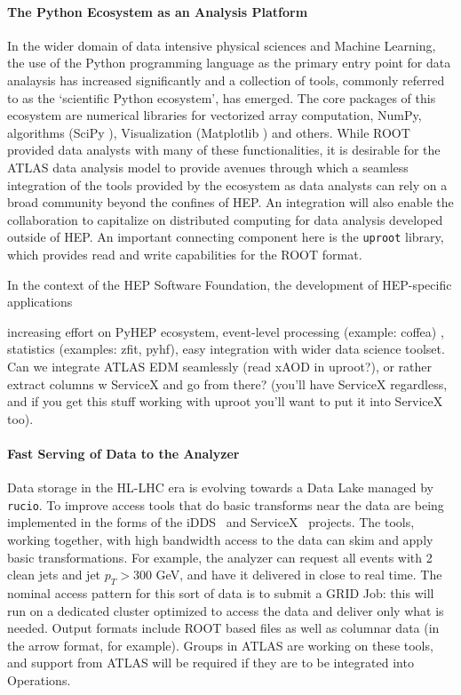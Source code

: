 \paragraph{The Python Ecosystem as an Analysis Platform}

In the wider domain of data intensive physical sciences and Machine Learning, the use of the Python programming language as the primary entry point for data analaysis has increased significantly and a collection of tools, commonly referred to as the `scientific Python ecosystem', has emerged. The core packages of this ecosystem are numerical libraries for vectorized array computation, NumPy\cite{numpy}, algorithms (SciPy \cite{scipy}), Visualization (Matplotlib \cite{matplotlib} ) and others. While ROOT provided data analysts with many of these functionalities, it is desirable for the ATLAS data analysis model to provide avenues through which a seamless integration of the tools provided by the ecosystem as data analysts can rely on a broad community beyond the confines of HEP. An integration will also enable the collaboration to capitalize on distributed computing for data analysis developed outside of HEP. An important connecting component here is the {\tt uproot}\cite{uproot-library} library, which provides read and write capabilities for the ROOT format.

In the context of the HEP Software Foundation, the development of HEP-specific applications 

increasing effort on PyHEP ecosystem, event-level processing (example: coffea) , statistics (examples: zfit, pyhf), easy integration with wider data science toolset. 
Can we integrate ATLAS EDM seamlessly (read xAOD in uproot?), or rather extract columns w   ServiceX and go from there? (you'll have ServiceX regardless, and if you get this stuff working with uproot you'll want to put it into ServiceX too).

\paragraph{Fast Serving of Data to the Analyzer}


Data storage in the HL-LHC era is evolving towards a Data Lake managed by {\tt rucio}. To improve access tools that do basic transforms near the data are being implemented in the forms of the iDDS~\cite{idds} and ServiceX~\cite{servicex} projects. The tools, working together, with high bandwidth access to the data can skim and apply basic transformations. For example, the analyzer can request all events with 2 clean jets and jet $p_T>300$ GeV, and have it delivered in close to real time. The nominal access pattern for this sort of data is to submit a GRID Job: this will run on a dedicated cluster optimized to access the data and deliver only what is needed. Output formats include ROOT based files as well as columnar data (in the arrow format, for example). Groups in ATLAS are working on these tools, and support from ATLAS will be required if they are to be integrated into Operations.

